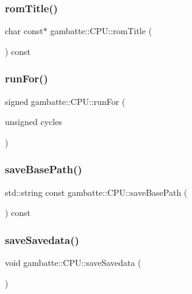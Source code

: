 \subsubsection{\texorpdfstring{rom\+Title()}{romTitle()}}
{\footnotesize\ttfamily char const$\ast$ gambatte\+::\+C\+P\+U\+::rom\+Title (\begin{DoxyParamCaption}{ }\end{DoxyParamCaption}) const\hspace{0.3cm}{\ttfamily [inline]}}

\mbox{\label{classgambatte_1_1CPU_a578dc9523b8c4fd01b65bac8ab66f3dd}} 
\subsubsection{\texorpdfstring{run\+For()}{runFor()}}
{\footnotesize\ttfamily signed gambatte\+::\+C\+P\+U\+::run\+For (\begin{DoxyParamCaption}\item[{unsigned}]{cycles }\end{DoxyParamCaption})}

\mbox{\label{classgambatte_1_1CPU_a8eb13a942b95e3b97fe21ac17be82715}} 
\subsubsection{\texorpdfstring{save\+Base\+Path()}{saveBasePath()}}
{\footnotesize\ttfamily std\+::string const gambatte\+::\+C\+P\+U\+::save\+Base\+Path (\begin{DoxyParamCaption}{ }\end{DoxyParamCaption}) const\hspace{0.3cm}{\ttfamily [inline]}}

\mbox{\label{classgambatte_1_1CPU_a4ece2687dec833880531bfaf010e63a6}} 
\subsubsection{\texorpdfstring{save\+Savedata()}{saveSavedata()}}
{\footnotesize\ttfamily void gambatte\+::\+C\+P\+U\+::save\+Savedata (\begin{DoxyParamCaption}{ }\end{DoxyParamCaption})\hspace{0.3cm}{\ttfamily [inline]}}

